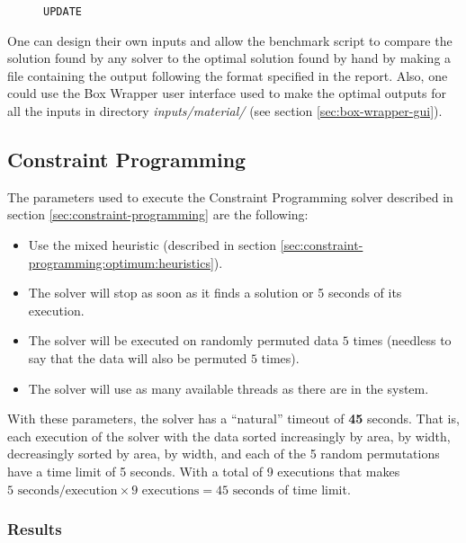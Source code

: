 \begin{figure}[H]
\centering
{\scriptsize
\begin{BVerbatim}
UPDATE
\end{BVerbatim}
}
\label{fig:benchmark-verbose:suboptimal}
\end{figure}

\hfill

One can design their own inputs and allow the benchmark script to compare
the solution found by any solver to the optimal solution found by hand by
making a file containing the output following the format specified in the
report. Also, one could use the Box Wrapper user interface used to make the
optimal outputs for all the inputs in directory \textit{inputs/material/}
(see section \ref{sec:box-wrapper-gui}).

\subsection{Constraint Programming}
\label{sec:benchmarking:constraint-programming}

The parameters used to execute the Constraint Programming solver described in section
\ref{sec:constraint-programming} are the following:
\begin{itemize}
	\item Use the mixed heuristic (described in section \ref{sec:constraint-programming:optimum:heuristics}).
	\item The solver will stop as soon as it finds a solution or 5 seconds of its execution.
	\item The solver will be executed on randomly permuted data $5$ times (needless to
	say that the data will also be permuted $5$ times).
	\item The solver will use as many available threads as there are in the system.
\end{itemize}

With these parameters, the solver has a ``natural'' timeout of \textbf{45} seconds.
That is, each execution of the solver with the data sorted increasingly by area, by
width, decreasingly sorted by area, by width, and each of the 5 random permutations
have a time limit of 5 seconds. With a total of 9 executions that makes
$5 \text{ seconds/execution} \times 9 \text{ executions} = 45 \text{ seconds}$ of time limit.

\subsubsection{Results}
\label{sec:benchmarking:constraint-programming:results}

